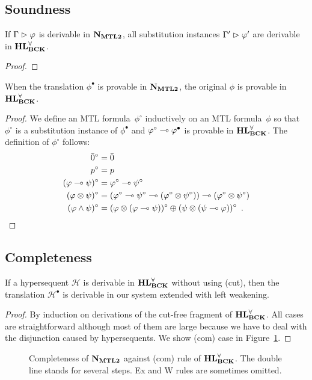 \subsection{Soundness}

 \begin{proposition}\label{prop:sound-ind}
  If $\Gamma\vartriangleright\varphi$ is derivable in $\mathbf{N}_{\mathbf{MTL2}}$, all substitution instances
  $\Gamma'\vartriangleright\varphi'$ are derivable in $\mathbf{HL}^\forall_{\mathbf{BCK}}$.
 \end{proposition}
  \begin{proof}
  \end{proof}

 \begin{proposition}
  When the translation $\phi^\bullet$ is provable in $\mathbf{N}_{\mathbf{MTL2}}$, the
  original $\phi$ is provable in $\mathbf{HL}^\forall_{\mathbf{BCK}}$.
 \end{proposition}
  \begin{proof}
   We define an MTL formula~$\phi^\circ$ inductively on an MTL
   formula~$\phi$ so that $\phi^\circ$ is a substitution instance of
   $\phi^\bullet$ and $\varphi^\circ\multimap\varphi^\bullet$ is provable in
   $\mathbf{HL}^\forall_{\mathbf{BCK}}$.
   The definition of $\phi^\circ$ follows:
   \begin{align*}
    \bar 0^\circ&= \bar 0\\
    p^\circ &=p \\
    (\varphi\multimap\psi)^\circ&=\varphi^\circ\multimap\psi^\circ\\
    (\varphi\otimes\psi)^\circ &=
    (\varphi^\circ\multimap\psi^\circ\multimap(\varphi^\circ\otimes\psi^\circ))\multimap(\varphi^\circ\otimes\psi^\circ)\\
    (\varphi\land\psi)^\circ &=
    (\varphi\otimes(\varphi\multimap\psi))^\circ \oplus
    (\psi\otimes(\psi\multimap\varphi))^\circ\enspace.
   \end{align*}
  \end{proof}


\subsection{Completeness}

\begin{proposition}
 If a hypersequent $\mathcal H$ is
 derivable in $\mathbf{HL}^\forall_{\mathbf{BCK}}$ without using (cut), then the translation $\mathcal H^\bullet$ is
 derivable in our system extended with left weakening.
\end{proposition}
\begin{proof}
 By induction on derivations of the cut-free fragment of $\mathbf{HL}^\forall_{\mathbf{BCK}}$.
 All cases are straightforward although most of them are large because
 we have to deal with the disjunction caused by hypersequents.
 We show (com) case in Figure~\ref{fig:completeness-com}.
\end{proof}
 \begin{figure}
  \caption{Completeness of $\mathbf{N}_{\mathbf{MTL2}}$ against (com) rule of $\mathbf{HL}^\forall_{\mathbf{BCK}}$.  The
  double line stands for several steps.  Ex and W rules are sometimes
  omitted.}
  \label{fig:completeness-com}
 \end{figure}

